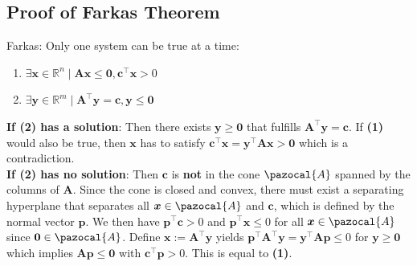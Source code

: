 \documentclass[english]{latex4ei/latex4ei_sheet}
\begin{document}
\begin{sectionbox}
	\subsection{Proof of Farkas Theorem}
	Farkas: Only one system can be true at a time: \\
	\begin{center}
		\begin{enumerate}
			\item $\exists \bm{x} \in \mathbb{R}^n \mid \bm{A}\bm{x} \leq \bm{0}, \bm{c}^\intercal\bm{x} > 0$
			\item $\exists \bm{y} \in \mathbb{R}^m \mid \bm{A}^\intercal\bm{y} = \bm{c}, \bm{y} \leq \bm{0}$
		\end{enumerate}
	\end{center}
	\vspace{0.5em}
	\textbf{If (2) has a solution}: Then there exists $\bm{y} \geq \bm{0}$ that fulfills $\bm{A}^\intercal\bm{y} = \bm{c}$. If \textbf{(1)} would also be true, then $\bm{x}$ has to satisfy $\bm{c}^\intercal\bm{x} = \bm{y}^\intercal\bm{A}\bm{x} > \bm{0}$ which is a contradiction. \\
	\textbf{If (2) has no solution}: Then $\bm{c}$ is \textbf{not} in the cone $\pazocal{A}$ spanned by the columns of $\bm{A}$. Since the cone is closed and convex, there must exist a separating hyperplane that separates all $\bm{x} \in \pazocal{A}$ and $\bm{c}$, which is defined by the normal vector $\bm{p}$. We then have $\bm{p}^\intercal\bm{c} > 0$ and $\bm{p}^\intercal\bm{x} \leq 0$ for all $\bm{x} \in \pazocal{A}$ since $\bm{0} \in \pazocal{A}$. Define $\bm{x} := \bm{A}^\intercal\bm{y}$ yields $\bm{p}^\intercal\bm{A}^\intercal\bm{y} = \bm{y}^\intercal\bm{A}\bm{p} \leq 0$ for $\bm{y} \geq \bm{0}$ which implies $\bm{A}\bm{p} \leq \bm{0}$ with $\bm{c}^\intercal\bm{p} > 0$. This is equal to \textbf{(1)}.
\end{sectionbox}
\end{document}
